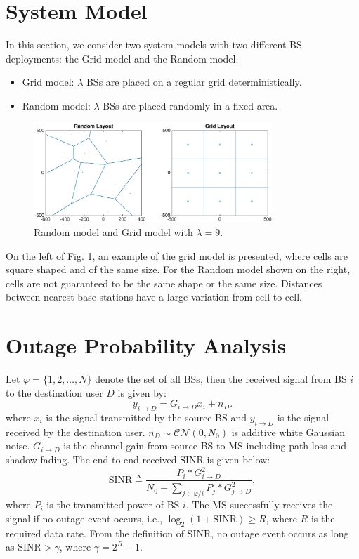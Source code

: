\documentclass[journal,10pt]{IEEEtran}
\begin{document}
 \section{System Model}
 \label{SystemModel}
 In this section, we consider two system models with two different BS deployments: the Grid model and the Random model.
 \begin{itemize}
 \item Grid model: $\lambda$ BSs are placed on a regular grid deterministically.
 \item Random model: $\lambda$ BSs are placed randomly in a fixed area.
 \end{itemize}
 \begin{figure}
 \centering
 \includegraphics[width=9cm]{systemLayout.eps}
 \caption{Random model and Grid model with $\lambda = 9$.}
 \label{4:RandomLayout}
 \end{figure}
On the left of Fig. \ref{4:RandomLayout}, an example of the grid model is presented, where cells are square shaped and of the same size. For the Random model shown on the right, cells are not guaranteed to be the same shape or the same size. Distances between nearest base stations have a large variation from cell to cell.


 \section{Outage Probability Analysis}
 \label{OutageProb}
 \par Let $\varphi = \{1, 2, \dots, N\}$ denote the set of all BSs, then the received signal from BS $i$ to the destination user $D$ is given by:
 \begin{equation}
 y_{i\to D} = G_{i\to D}x_{i}+n_{D}.
 \end{equation}
 where $x_{i}$ is the signal transmitted by the source BS and $y_{i\to D}$ is the signal received by the destination user. $n_{D}\sim \mathcal{CN}(0,N_{0})$ is additive white Gaussian noise. $G_{i\to D}$ is the channel gain from source BS to MS including path loss and shadow fading. The end-to-end received $\text{SINR}$ is given below:
 \begin{equation}
 \text{SINR} \triangleq \frac{P_{i}*G_{i\to D}^{2}}{N_{0}+\sum_{j\in \varphi/i}P_{j}*G_{j\to D}^2},
 \end{equation}
 where $P_{i}$ is the transmitted power of BS $i$. The MS successfully receives the signal if no outage event occurs, i.e., $\log_{2}(1+\text{SINR})\ge R$, where $R$ is the required data rate. From the definition of SINR, no outage event occurs as long as $\text{SINR} > \gamma$, where $\gamma = 2^{R}-1$.
\end{document}
